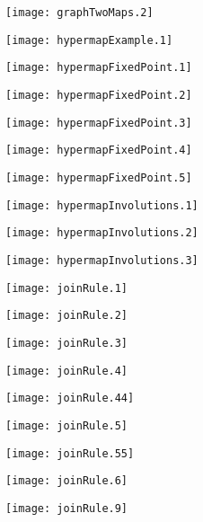\documentclass[12pt,a4paper,amstags,fleqn,reqno]{article}
\begin{document}
\begin{center} \texttt{[image: graphTwoMaps.2]} \end{center}
\begin{center} \texttt{[image: hypermapExample.1]} \end{center}
\begin{center} \texttt{[image: hypermapFixedPoint.1]} \end{center}
\begin{center} \texttt{[image: hypermapFixedPoint.2]} \end{center}
\begin{center} \texttt{[image: hypermapFixedPoint.3]} \end{center}
\begin{center} \texttt{[image: hypermapFixedPoint.4]} \end{center}
\begin{center} \texttt{[image: hypermapFixedPoint.5]} \end{center}
\begin{center} \texttt{[image: hypermapInvolutions.1]} \end{center}
\begin{center} \texttt{[image: hypermapInvolutions.2]} \end{center}
\begin{center} \texttt{[image: hypermapInvolutions.3]} \end{center}
\begin{center} \texttt{[image: joinRule.1]} \end{center}
\begin{center} \texttt{[image: joinRule.2]} \end{center}
\begin{center} \texttt{[image: joinRule.3]} \end{center}
\begin{center} \texttt{[image: joinRule.4]} \end{center}
\begin{center} \texttt{[image: joinRule.44]} \end{center}
\begin{center} \texttt{[image: joinRule.5]} \end{center}
\begin{center} \texttt{[image: joinRule.55]} \end{center}
\begin{center} \texttt{[image: joinRule.6]} \end{center}
\begin{center} \texttt{[image: joinRule.9]} \end{center}
\end{document}
